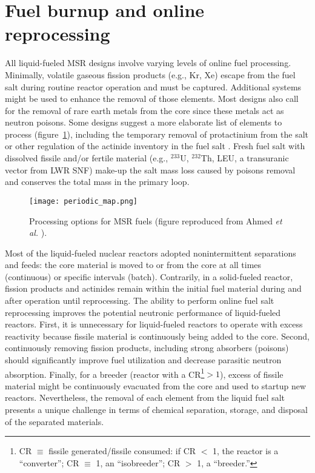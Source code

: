 \section{Fuel burnup and online reprocessing}
All liquid-fueled \gls{MSR} designs involve varying levels of online fuel 
processing. Minimally, volatile gaseous fission products (e.g., Kr, Xe) 
escape from the fuel salt during routine reactor operation and must be 
captured. Additional systems might be used to enhance the removal of those 
elements. Most designs also call for the removal of rare earth metals from 
the core since these metals act as neutron poisons. Some designs suggest a 
more elaborate list of elements to process (figure~\ref{fig:periodic_tab}), 
including the temporary removal of protactinium from the salt or other 
regulation of the actinide inventory in the fuel salt 
\cite{ahmad_neutronics_2015}. Fresh fuel salt with dissolved fissile and/or 
fertile material (e.g., $^{233}$U, $^{232}$Th, \gls{LEU}, a transuranic 
vector from \gls{LWR} \gls{SNF}) make-up the salt mass loss caused by poisons 
removal and conserves the total mass in the primary loop.
\begin{figure}[htp!] %
  \centering
  \texttt{[image: periodic\_map.png]}
  \caption{Processing options for \gls{MSR} fuels (figure reproduced from 
  Ahmed \emph{et al.} \cite{ahmad_neutronics_2015}).}
  \label{fig:periodic_tab}
\end{figure}

Most of the liquid-fueled nuclear reactors adopted nonintermittent 
separations and feeds: the core material is moved to or from the core at all 
times (continuous) or specific intervals (batch). Contrarily, in a 
solid-fueled reactor, fission products and actinides 
remain within the initial fuel material during and after operation until 
reprocessing. The ability to perform online fuel salt reprocessing improves 
the potential neutronic performance of liquid-fueled reactors. First, it 
is unnecessary for liquid-fueled reactors to operate with excess reactivity 
because fissile material is continuously being added to the core. Second, 
continuously removing fission products, including strong absorbers (poisons) 
should significantly improve fuel utilization and decrease parasitic 
neutron absorption. Finally, for a breeder (reactor with a 
\gls{CR}\footnote{\gls{CR} $\equiv$ fissile generated/fissile consumed: if CR 
$<$ 1, the reactor is a ``converter''; CR $\equiv$ 1, an ``isobreeder''; 
CR $>$ 1, a ``breeder.''}$>1$), excess of fissile material might be 
continuously evacuated from the core and used to startup new reactors. 
Nevertheless, the removal of each element from the liquid fuel salt presents 
a unique challenge in terms of chemical separation, storage, and disposal of 
the separated materials.

